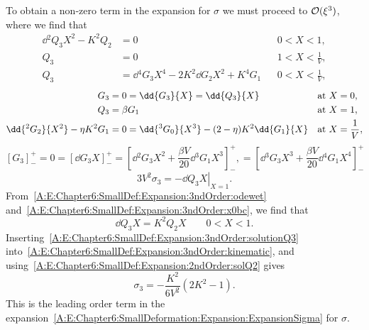 \begin{subappendices}
To obtain a non-zero term in the expansion for $\sigma$ we must proceed to $\mathcal{O}(\xi^3)$, where we find that
\begin{align}
 \dd{^2 Q_3}{X^2} - K^2 Q_2 &= 0 & &0 < X<1,\label{A:E:Chapter6:SmallDef:Expansion:3ndOrder:odewet}\\
Q_3 &= 0 & &1 < X< \frac{1}{V},\\
Q_3 &= \dd{^4 G_3}{X^4} - 2K^2\dd{G_2}{X^2}+ K^4 G_1 & & 0 < X < \frac{1}{V},
\end{align}
\begin{align}
G_3 &= 0 = \dd{G_3}{X}= \dd{Q_3}{X} & &\text{at}~X = 0,\label{A:E:Chapter6:SmallDef:Expansion:3ndOrder:x0bc}\\
Q_3 &=\beta G_1 & &\text{at}~X = 1,\label{A:E:Chapter6:SmallDef:Expansion:3ndOrder:PressureBC}\\
\dd{^2 G_2}{X^2} - \poisson K^2 G_1 &=0 = \dd{^3 G_0}{X^3}  - (2- \poisson)K^2 \dd{G_1}{X}& &\text{at}~X = \frac{1}{V},
\end{align}
\begin{equation}
\left[G_3\right]_-^+ =0 = \left[\dd{G_3}{X}\right]_-^+ = \left[\dd{^2 G_3}{X^2} + \frac{\beta V}{20}\dd{^3G_1}{X^3}\right]_-^+, = \left[\dd{^3 G_3}{X^3} + \frac{\beta V}{20}\dd{^4 G_1}{X^4}\right]_-^+
\end{equation}
\begin{equation}\label{A:E:Chapter6:SmallDef:Expansion:3ndOrder:kinematic}
3V^2 \sigma_3 = -\left.\dd{Q_3}{X}\right|_{X=1}.
\end{equation}
From~\eqref{A:E:Chapter6:SmallDef:Expansion:3ndOrder:odewet} and~\eqref{A:E:Chapter6:SmallDef:Expansion:3ndOrder:x0bc}, we find that
\begin{equation}\label{A:E:Chapter6:SmallDef:Expansion:3ndOrder:solutionQ3}
\dd{Q_3}{X} = K^2 Q_2 X \qquad 0 < X < 1.
\end{equation}
Inserting~\eqref{A:E:Chapter6:SmallDef:Expansion:3ndOrder:solutionQ3} into~\eqref{A:E:Chapter6:SmallDef:Expansion:3ndOrder:kinematic}, and using~\eqref{A:E:Chapter6:SmallDef:Expansion:2ndOrder:solQ2} gives
\begin{equation}\label{A:E:Chapter6:SmallDef:Expansion:3ndOrder:solutionsigma3}
\sigma_3  = -\frac{K^2}{6V^2}\left(2K^2 - 1\right).
\end{equation}
This is the leading order term in the expansion~\eqref{A:E:Chapter6:SmallDeformation:Expansion:ExpansionSigma} for $\sigma$.


\end{subappendices}
